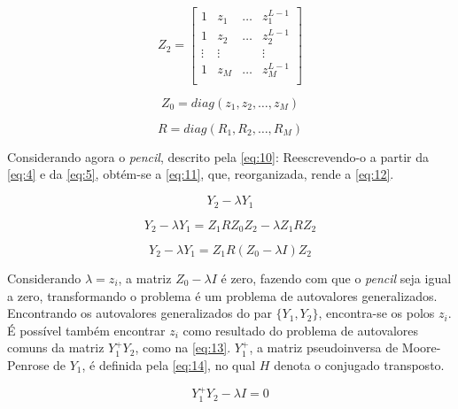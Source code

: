 \documentclass[12pt]{article}
\begin{document}
\begin{equation} \label{eq:7}
    Z_2 = \begin{bmatrix} 1 & z_1 & \dots & z_1^{L-1} \\
                            1 & z_2 & \dots & z_2^{L-1} \\
                            \vdots & \vdots & & \vdots \\
                            1 & z_M & \dots & z_M^{L-1} \\
    \end{bmatrix}
\end{equation}

\begin{equation} \label{eq:8}
    Z_0 = diag(z_1, z_2, \dots, z_M)
\end{equation}

\begin{equation} \label{eq:9}
    R = diag(R_1, R_2, \dots, R_M)
\end{equation}

Considerando agora o \textit{pencil}, descrito pela \autoref{eq:10}: Reescrevendo-o a partir da \autoref{eq:4} e da \autoref{eq:5}, obtém-se a \autoref{eq:11}, que, reorganizada, 
rende a \autoref{eq:12}.

\begin{equation} \label{eq:10}
    Y_2 - \lambda Y_1
\end{equation}

\begin{equation} \label{eq:11}
    Y_2 - \lambda Y_1 = Z_1 R Z_0 Z_2 - \lambda Z_1 R Z_2
\end{equation}

\begin{equation} \label{eq:12}
    Y_2 - \lambda Y_1 = Z_1 R (Z_0 - \lambda I) Z_2
\end{equation}

Considerando $\lambda = z_i$, a matriz $Z_0 - \lambda I$ é zero, fazendo com que o \textit{pencil} seja igual a zero, transformando o problema é um problema de autovalores generalizados. 
Encontrando os autovalores generalizados do par $\{Y_1, Y_2\}$, encontra-se os polos $z_i$. É possível também encontrar $z_i$ como resultado do problema de autovalores comuns da matriz $Y_1^+ Y_2$, como na
\autoref{eq:13}. $Y_1^+$, a matriz pseudoinversa de Moore-Penrose de $Y_1$, é definida pela \autoref{eq:14}, no qual $H$ denota o conjugado transposto. 

\begin{equation} \label{eq:13}
    Y_1^+ Y_2 - \lambda I = 0
\end{equation}
\end{document}
